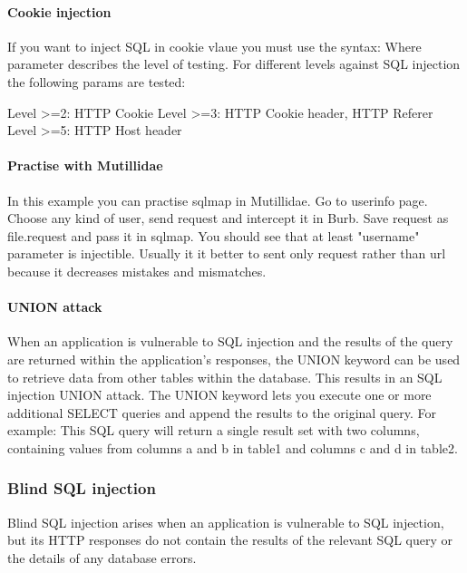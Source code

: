 \paragraph{Cookie injection}
If you want to inject SQL in cookie vlaue you must use the syntax:
Where  parameter describes the level of testing.
For different levels against SQL injection the following params are tested:

Level >=2: HTTP Cookie
\newline
Level >=3: HTTP Cookie header, HTTP Referer
\newline
Level >=5: HTTP Host header
\newline
\paragraph{Practise with Mutillidae}
In this example you can practise sqlmap in Mutillidae.
Go to userinfo page.
Choose  any kind of user, send request and intercept it in Burb.
Save request as file.request and pass it in sqlmap.
You should see that at least "username" parameter is injectible.
Usually it it better to sent only request rather than url because it decreases mistakes and mismatches.
\paragraph{UNION attack}
When an application is vulnerable to SQL injection and the results of the query are returned within the application's responses, the UNION keyword can be used to retrieve data from other tables within the database.
This results in an SQL injection UNION attack.
The UNION keyword lets you execute one or more additional SELECT queries and append the results to the original query.
For example: 
This SQL query will return a single result set with two columns, containing values from columns a and b in table1 and columns c and d in table2.
\subsubsection{Blind SQL injection}
Blind SQL injection arises when an application is vulnerable to SQL injection, but its HTTP responses do not contain the results of the relevant SQL query or the details of any database errors.

